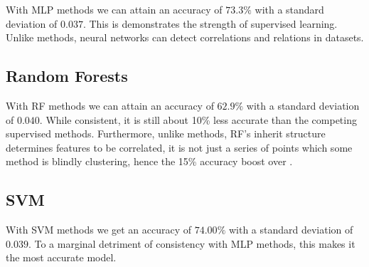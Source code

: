 With MLP methods we can attain an accuracy of $73.3\%$ with a standard deviation of $0.037$. This is demonstrates the strength of supervised learning. Unlike \knn methods, neural networks can detect correlations and relations in datasets.

\subsection{Random Forests}


With RF methods we can attain an accuracy of $62.9\%$ with a standard deviation of $0.040$. While consistent, it is still about 10\% less accurate than the competing supervised methods. Furthermore, unlike \knn methods, RF's inherit structure determines features to be correlated, it is not just a series of points which some method is blindly clustering, hence the 15\% accuracy boost over \knn.

\subsection{SVM}


With SVM methods we get an accuracy of $74.00\%$ with a standard deviation of $0.039$. To a marginal detriment of consistency with MLP methods, this makes it the most accurate model.